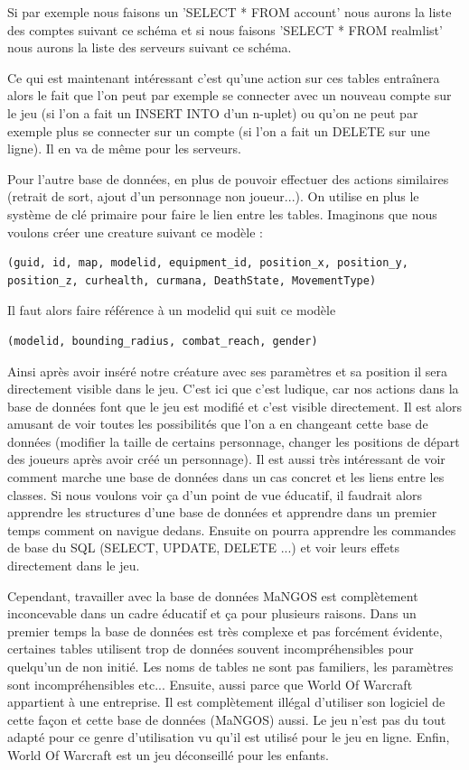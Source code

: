 Si par exemple nous faisons un 'SELECT * FROM account' nous aurons la liste des comptes suivant ce schéma \cite{64} et si nous faisons 'SELECT * FROM realmlist' nous aurons la liste des serveurs suivant ce schéma. \cite{65}

Ce qui est maintenant intéressant c'est qu'une action sur ces tables entraînera alors le fait que l'on peut par exemple se connecter avec un nouveau compte sur le jeu (si l'on a fait un INSERT INTO d'un n-uplet) ou qu'on ne peut par exemple plus se connecter sur un compte (si l'on a fait un DELETE sur une ligne). Il en va de même pour les serveurs.

Pour l'autre base de données, en plus de pouvoir effectuer des actions similaires (retrait de sort, ajout d'un personnage non joueur...). On utilise en plus le système de clé primaire pour faire le lien entre les tables. Imaginons que nous voulons créer une creature suivant ce modèle :

\begin{lstlisting}[frame=single]
(guid, id, map, modelid, equipment_id, position_x, position_y, 
position_z, curhealth, curmana, DeathState, MovementType)
\end{lstlisting}

Il faut alors faire référence à un modelid qui suit ce modèle 
\begin{lstlisting}[frame=single]
(modelid, bounding_radius, combat_reach, gender)
\end{lstlisting}

Ainsi après avoir inséré notre créature avec ses paramètres et sa position il sera directement visible dans le jeu. C'est ici que c'est ludique, car nos actions dans la base de données font que le jeu est modifié et c'est visible directement. Il est alors amusant de voir toutes les possibilités que l'on a en changeant cette base de données (modifier la taille de certains personnage, changer les positions de départ des joueurs après avoir créé un personnage). Il est aussi très intéressant de voir comment marche une base de données dans un cas concret et les liens entre les classes. Si nous voulons voir ça d'un point de vue éducatif, il faudrait alors apprendre les structures d'une base de données et apprendre dans un premier temps comment on navigue dedans. Ensuite on pourra apprendre les commandes de base du SQL (SELECT, UPDATE, DELETE ...) et voir leurs effets directement dans le jeu.

Cependant, travailler avec la base de données MaNGOS est complètement inconcevable dans un cadre éducatif et ça pour plusieurs raisons. Dans un premier temps la base de données est très complexe et pas forcément évidente, certaines tables utilisent trop de données souvent incompréhensibles pour quelqu'un de non initié. Les noms de tables ne sont pas familiers, les paramètres sont incompréhensibles etc... Ensuite, aussi parce que World Of Warcraft appartient à une entreprise. Il est complètement illégal d'utiliser son logiciel de cette façon et cette base de données (MaNGOS) aussi. Le jeu n'est pas du tout adapté pour ce genre d'utilisation vu qu'il est utilisé pour le jeu en ligne. Enfin, World Of Warcraft est un jeu déconseillé pour les enfants.

